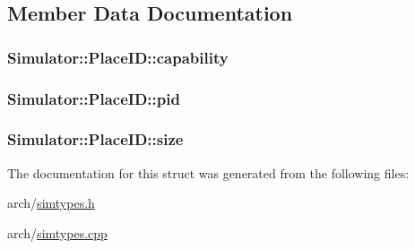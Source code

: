 \subsection{Member Data Documentation}
\hypertarget{struct_simulator_1_1_place_i_d_aa7d36f9f21694c268b3f07309b6d633e}{
\subsubsection[{capability}]{ Simulator\+::\+Place\+I\+D\+::capability}}\label{struct_simulator_1_1_place_i_d_aa7d36f9f21694c268b3f07309b6d633e}
\hypertarget{struct_simulator_1_1_place_i_d_ad6bb1b4ebb772cf3c76ab76215e8bf96}{
\subsubsection[{pid}]{ Simulator\+::\+Place\+I\+D\+::pid}}\label{struct_simulator_1_1_place_i_d_ad6bb1b4ebb772cf3c76ab76215e8bf96}
\hypertarget{struct_simulator_1_1_place_i_d_ae0d5445aa7d2f45ecb7472b19de0b5c5}{
\subsubsection[{size}]{ Simulator\+::\+Place\+I\+D\+::size}}\label{struct_simulator_1_1_place_i_d_ae0d5445aa7d2f45ecb7472b19de0b5c5}


The documentation for this struct was generated from the following files\+:\begin{DoxyCompactItemize}
\item 
arch/\hyperlink{simtypes_8h}{simtypes.\+h}\item 
arch/\hyperlink{simtypes_8cpp}{simtypes.\+cpp}\end{DoxyCompactItemize}
